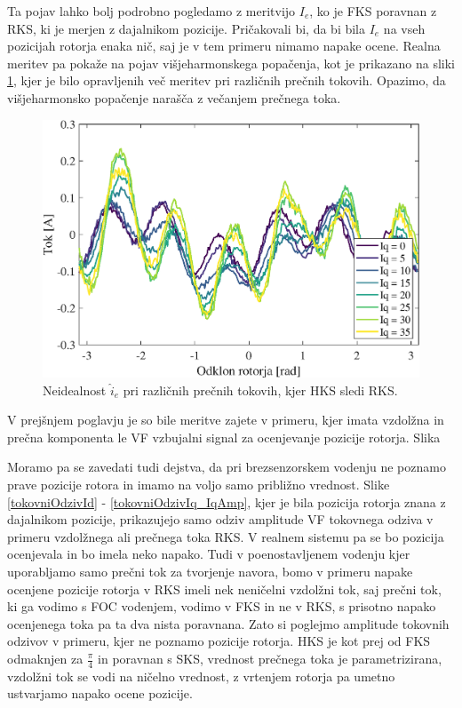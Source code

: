 \documentclass[a4paper,twoside,openright,12pt,slovene]{book}
\begin{document}
Ta pojav lahko bolj podrobno pogledamo z meritvijo $I_e$, ko je FKS poravnan z RKS, ki je merjen z dajalnikom pozicije. Pričakovali bi, da bi bila $I_e$
na vseh pozicijah rotorja enaka nič, saj je v tem primeru nimamo napake ocene. Realna meritev pa pokaže na pojav višjeharmonskega popačenja, kot je prikazano na sliki
\ref{tokovniOdzivIs_HKSslediRKS_diff}, kjer je bilo opravljenih več meritev pri različnih prečnih tokovih. Opazimo, da višjeharmonsko popačenje narašča z večanjem prečnega toka.

\begin{figure}[!htbp]
    \centering
    \includegraphics[width=1\columnwidth]{Slike/tokovniOdzivIs_HKSslediRKS_diff.eps}
    \caption{\label{tokovniOdzivIs_HKSslediRKS_diff} Neidealnost $\hat{i}_{e}$ pri različnih prečnih tokovih, kjer HKS sledi RKS.}
\end{figure}

V prejšnjem poglavju je so bile meritve zajete v primeru, kjer imata vzdolžna in prečna komponenta le VF vzbujalni signal za ocenjevanje pozicije rotorja. Slika 



Moramo pa se zavedati tudi dejstva, da pri brezsenzorskem vodenju ne poznamo prave pozicije rotora in imamo na voljo samo približno vrednost. Slike \ref{tokovniOdzivId} - \ref{tokovniOdzivIq_IqAmp},
kjer je bila pozicija rotorja znana z dajalnikom pozicije, prikazujejo samo odziv amplitude VF tokovnega odziva v primeru vzdolžnega ali prečnega toka RKS. V realnem sistemu pa se bo pozicija
ocenjevala in bo imela neko napako. Tudi v poenostavljenem vodenju kjer uporabljamo samo prečni tok za tvorjenje navora, bomo v primeru napake ocenjene pozicije rotorja v RKS imeli nek neničelni
vzdolžni tok, saj prečni tok, ki ga vodimo s FOC vodenjem, vodimo v FKS in ne v RKS, s prisotno napako ocenjenega toka pa ta dva nista poravnana. Zato si poglejmo amplitude tokovnih odzivov v primeru,
kjer ne poznamo pozicije rotorja. HKS je kot prej od FKS odmaknjen za $\frac{\pi}{4}$ in poravnan s SKS, vrednost prečnega toka je parametrizirana, vzdolžni tok se vodi na ničelno vrednost, z vrtenjem
rotorja pa umetno ustvarjamo napako ocene pozicije.
\end{document}
